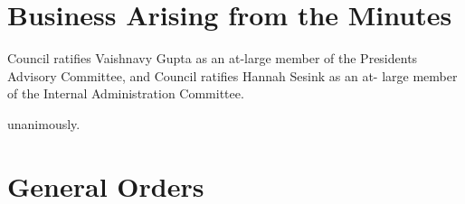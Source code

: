 \section*{Business Arising from the Minutes}


\begin{motion}
    \birt Council ratifies Vaishnavy Gupta as an at-large member of the 
    Presidents Advisory Committee, and 
    \bifrt Council ratifies Hannah Sesink as an at- large member of the 
    Internal Administration Committee.
    \movers{\brian}{\tomson}

    \carries unanimously. 
\end{motion}

\section*{General Orders}

